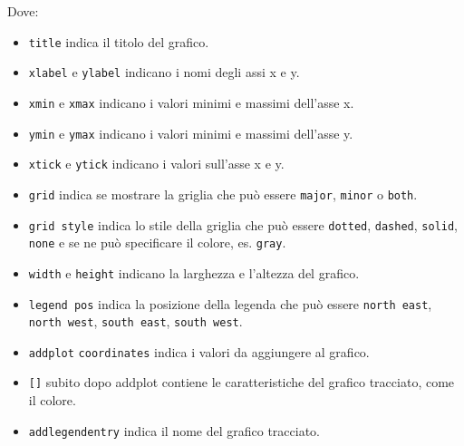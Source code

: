 Dove:
\begin{itemize}
    \item \lstinline+title+ indica il titolo del grafico. 
    
    \item \lstinline+xlabel+ e \lstinline+ylabel+ indicano i nomi degli assi x e y. 
    
    \item \lstinline+xmin+ e \lstinline+xmax+ indicano i valori minimi e massimi dell'asse x. 

    \item \lstinline+ymin+ e \lstinline+ymax+ indicano i valori minimi e massimi dell'asse y.
    
    \item \lstinline+xtick+ e \lstinline+ytick+ indicano i valori sull'asse x e y.
    
    \item \lstinline+grid+ indica se mostrare la griglia che può essere \texttt{major}, \texttt{minor} o \texttt{both}.
    
    \item \lstinline+grid style+ indica lo stile della griglia che può essere \texttt{dotted}, \texttt{dashed}, \texttt{solid}, \texttt{none} e se ne può specificare il colore, es. \texttt{gray}.
     
    \item \lstinline+width+ e \lstinline+height+ indicano la larghezza e l'altezza del grafico.
     
    \item \lstinline+legend pos+ indica la posizione della legenda che può essere \texttt{north east}, \texttt{north west}, \texttt{south east}, \texttt{south west}.
    
    \item \lstinline+addplot+ \lstinline+coordinates+ indica i valori da aggiungere al grafico.
    
    \item \lstinline+[]+ subito dopo addplot contiene le caratteristiche del grafico tracciato, come il colore.
    
    \item \lstinline+addlegendentry+ indica il nome del grafico tracciato.
\end{itemize}



